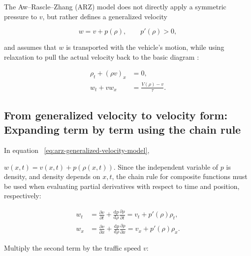 \documentclass[11pt,a4paper,openany]{book}
\numberwithin{equation}{chapter}
\numberwithin{figure}{chapter}
\numberwithin{table}{chapter}
\begin{document}
The Aw–Rascle–Zhang (ARZ) model does not directly apply a symmetric pressure to $v$, but rather defines a generalized velocity

\begin{equation}
w=v+p(\rho),\qquad p'(\rho)>0,
\label{eq:arz-generalized-velocity-model}
\end{equation}

and assumes that $w$ is transported with the vehicle’s motion, while using relaxation to pull the actual velocity back to the basic diagram \cite{awrascle2000,zhang2002}:







\begin{subequations}
\label{eq:arz-model-derivation}
\begin{align}
\rho_t+(\rho v)_x&=0,\\
w_t+vw_x&=\frac{V(\rho)-v}{\tau}.
\end{align}
\end{subequations}

\subsection{From generalized velocity to velocity form: Expanding term by term using the chain rule}










In equation ~\eqref{eq:arz-generalized-velocity-model},

$w(x,t)=v(x,t)+p(\rho(x,t))$. Since the independent variable of $p$ is density, and density depends on $x,t$, the chain rule for composite functions must be used when evaluating partial derivatives with respect to time and position, respectively:


\begin{subequations}
\label{eq:arz-chain-components}
\begin{align}
w_t
&=\frac{\partial v}{\partial t}
+\frac{\mathrm dp}{\mathrm d\rho}
\frac{\partial\rho}{\partial t}
=v_t+p'(\rho)\rho_t,\\
w_x
&=\frac{\partial v}{\partial x}
+\frac{\mathrm dp}{\mathrm d\rho}
\frac{\partial\rho}{\partial x}
=v_x+p'(\rho)\rho_x.
\end{align}
\end{subequations}


Multiply the second term by the traffic speed $v$:
\end{document}
